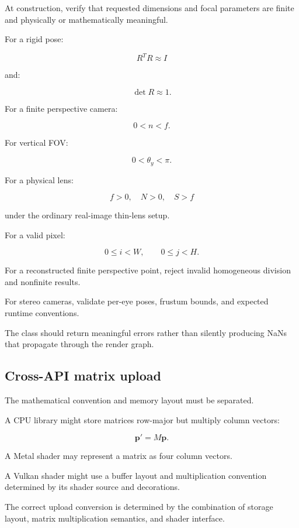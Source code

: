 \hypertarget{02-foundations-ii-ch037-camera-invariants}{}

At construction, verify that requested dimensions and focal parameters are finite and physically or mathematically meaningful.

For a rigid pose:

\[ R^TR\approx I \]

and:

\[ \det R\approx1. \]

For a finite perspective camera:

\[ 0<n<f. \]

For vertical FOV:

\[ 0<\theta_y<\pi. \]

For a physical lens:

\[ f>0,\quad N>0,\quad S>f \]

under the ordinary real-image thin-lens setup.

For a valid pixel:

\[ 0\le i<W,\qquad0\le j<H. \]

For a reconstructed finite perspective point, reject invalid homogeneous division and nonfinite results.

For stereo cameras, validate per-eye poses, frustum bounds, and expected runtime conventions.

The class should return meaningful errors rather than silently producing NaNs that propagate through the render graph.

\subsection{Cross-API matrix upload}\label{02-foundations-ii-ch037-cross-api-matrix-upload}

\hypertarget{02-foundations-ii-ch037-cross-api-matrix-upload}{}

The mathematical convention and memory layout must be separated.

A CPU library might store matrices row-major but multiply column vectors:

\[ \mathbf p'=M\mathbf p. \]

A Metal shader may represent a matrix as four column vectors.

A Vulkan shader might use a buffer layout and multiplication convention determined by its shader source and decorations.

The correct upload conversion is determined by the combination of storage layout, matrix multiplication semantics, and shader interface.

